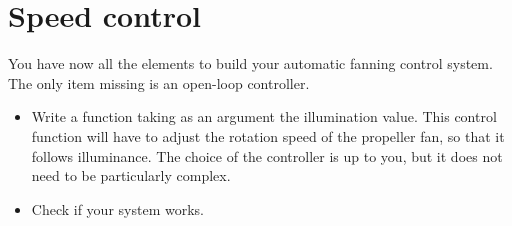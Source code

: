 \documentclass[11pt,a4paper]{article}
\theoremstyle{definition}%
\begin{document}



\section{Speed control}
You have now all the elements to build your automatic fanning control system.
The only item missing is an open-loop controller. 

\begin{itemize}
	\item Write a function taking as an argument the illumination value.
	This control function will have to adjust the rotation speed of the propeller fan, so that it follows illuminance.
	The choice of the controller is up to you, but it does not need to be particularly complex.
	\item Check if your system works.
\end{itemize}
\end{document}
